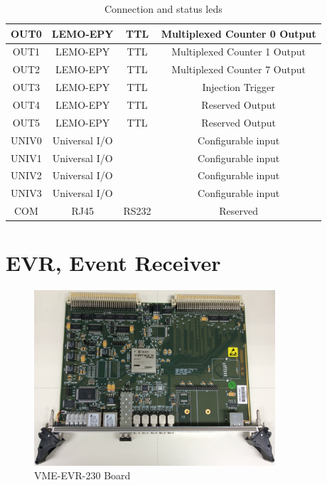 \documentclass[11pt
  , a4paper
  , article
  , oneside
]{memoir}
\begin{document}
\begin{table}[h!]
\begin{center}
\begin{tabular} {c|c|c|c}
			OUT0 & LEMO-EPY & TTL & Multiplexed Counter 0 Output  \\ \hline
			OUT1 & LEMO-EPY & TTL & Multiplexed Counter 1 Output  \\ \hline
			OUT2 & LEMO-EPY & TTL & Multiplexed Counter 7 Output  \\ \hline
			OUT3 & LEMO-EPY & TTL & Injection Trigger  \\ \hline
			OUT4 & LEMO-EPY & TTL & Reserved Output  \\ \hline
			OUT5 & LEMO-EPY & TTL & Reserved Output  \\ \hline
			UNIV0 & Universal I/O &  & Configurable input  \\ \hline
			UNIV1 & Universal I/O &  & Configurable input  \\ \hline
			UNIV2 & Universal I/O &  & Configurable input  \\ \hline
			UNIV3 & Universal I/O &  & Configurable input  \\ \hline
			COM   & RJ45 & RS232 & Reserved  \\ \hline
		\end{tabular}
		\caption{  Connection and status leds }
		\label{table:connection_statusled} 
	\end{center}
	\end{table} 
	
	\clearpage

\section{EVR, Event Receiver}

\begin{figure}[h!]
	\centering
	\includegraphics[width=0.8\textwidth]{./images/evr_230.eps}
	\caption{VME-EVR-230 Board}
	\label{fig:evr_230_board} 
\end{figure}
\end{document}
